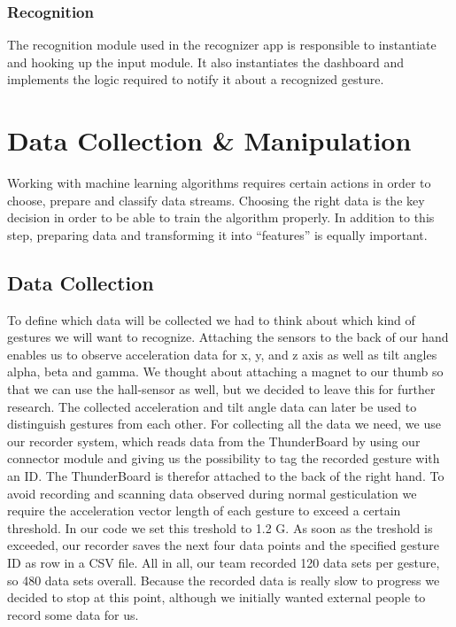 \subsection{Recognition}
\label{ch:SystemDesign:sec:Components:sub:Recognition}

The recognition module used in the recognizer app is responsible to instantiate and hooking up the input module. It also instantiates the dashboard and implements the logic required to notify it about a recognized gesture.

\chapter{Data Collection \& Manipulation}
\label{ch:DataCollection}

Working  with  machine  learning  algorithms  requires  certain  actions  in  order  to choose, prepare and classify data streams.
Choosing the right data is the key decision in order to be able to train the  algorithm properly.
In addition to this  step, preparing data and transforming it into “features” is equally important. 

\section{Data Collection}
\label{ch:DataCollection:sec:DataCollection}

To  define  which  data  will  be  collected  we  had  to  think  about  which  kind  of gestures  we  will  want  to  recognize.
Attaching  the  sensors  to  the  back  of  our  hand enables us to observe acceleration data  for x,  y, and z axis  as well  as tilt  angles  alpha, beta and gamma.
We thought about attaching a magnet to our thumb so that we can use the hall-sensor as well,  but we decided to leave this  for  further research.
The collected acceleration and tilt angle data can later be used to distinguish gestures from each other.
For collecting all the data we need, we use our recorder system, which reads data from the ThunderBoard by using our connector module and giving us the possibility to tag the recorded gesture with an ID.
The ThunderBoard is therefor attached to the back of the right hand.
To avoid recording and scanning data observed during normal gesticulation we require the acceleration vector length of each gesture to exceed a certain threshold.
In our code we set this treshold to 1.2 G.
As soon as the treshold is exceeded, our recorder saves the next four data points and the specified gesture ID as row in a CSV file.
All in all, our team recorded 120 data sets per gesture, so 480 data sets overall.
Because the recorded data is really slow to progress we decided to stop at this point, although we initially wanted external people to record some data for us.

